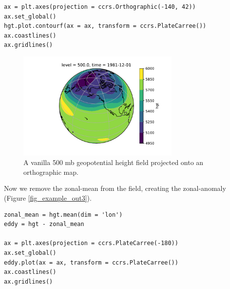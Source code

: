 \documentclass[final, double]{ua-thesis}
\begin{document}
\begin{singlespacing}
\begin{verbatim}
ax = plt.axes(projection = ccrs.Orthographic(-140, 42))
ax.set_global()
hgt.plot.contourf(ax = ax, transform = ccrs.PlateCarree())
ax.coastlines()
ax.gridlines()
\end{verbatim}
\end{singlespacing}

\begin{figure}[h]
 \centerline{\includegraphics[width=19pc]{p2figures/fig_example_out1.pdf}}
  \caption{A vanilla 500 mb geopotential height field projected onto an orthographic map.}\label{fig_example_out1}
\end{figure}

Now we remove the zonal-mean from the field, creating the zonal-anomaly (Figure \ref{fig_example_out3}).

\begin{singlespacing}
\begin{verbatim}
zonal_mean = hgt.mean(dim = 'lon')
eddy = hgt - zonal_mean

ax = plt.axes(projection = ccrs.PlateCarree(-180))
ax.set_global()
eddy.plot(ax = ax, transform = ccrs.PlateCarree())
ax.coastlines()
ax.gridlines()
\end{verbatim}
\end{singlespacing}
\end{document}
